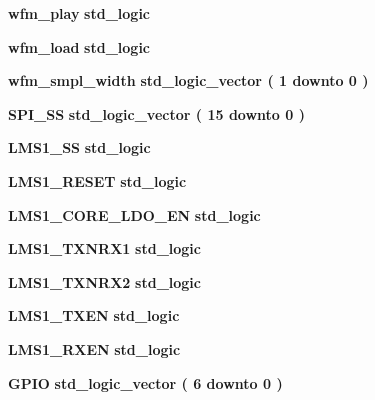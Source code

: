 \begin{DoxyCompactItemize}
\item 
{\bf wfm\+\_\+play} {\bfseries {\bfseries \textcolor{comment}{std\+\_\+logic}\textcolor{vhdlchar}{ }}} 
\item 
{\bf wfm\+\_\+load} {\bfseries {\bfseries \textcolor{comment}{std\+\_\+logic}\textcolor{vhdlchar}{ }}} 
\item 
{\bf wfm\+\_\+smpl\+\_\+width} {\bfseries {\bfseries \textcolor{comment}{std\+\_\+logic\+\_\+vector}\textcolor{vhdlchar}{ }\textcolor{vhdlchar}{(}\textcolor{vhdlchar}{ }\textcolor{vhdlchar}{ } \textcolor{vhdldigit}{1} \textcolor{vhdlchar}{ }\textcolor{keywordflow}{downto}\textcolor{vhdlchar}{ }\textcolor{vhdlchar}{ } \textcolor{vhdldigit}{0} \textcolor{vhdlchar}{ }\textcolor{vhdlchar}{)}\textcolor{vhdlchar}{ }}} 
\item 
{\bf S\+P\+I\+\_\+\+SS} {\bfseries {\bfseries \textcolor{comment}{std\+\_\+logic\+\_\+vector}\textcolor{vhdlchar}{ }\textcolor{vhdlchar}{(}\textcolor{vhdlchar}{ }\textcolor{vhdlchar}{ } \textcolor{vhdldigit}{15} \textcolor{vhdlchar}{ }\textcolor{keywordflow}{downto}\textcolor{vhdlchar}{ }\textcolor{vhdlchar}{ } \textcolor{vhdldigit}{0} \textcolor{vhdlchar}{ }\textcolor{vhdlchar}{)}\textcolor{vhdlchar}{ }}} 
\item 
{\bf L\+M\+S1\+\_\+\+SS} {\bfseries {\bfseries \textcolor{comment}{std\+\_\+logic}\textcolor{vhdlchar}{ }}} 
\item 
{\bf L\+M\+S1\+\_\+\+R\+E\+S\+ET} {\bfseries {\bfseries \textcolor{comment}{std\+\_\+logic}\textcolor{vhdlchar}{ }}} 
\item 
{\bf L\+M\+S1\+\_\+\+C\+O\+R\+E\+\_\+\+L\+D\+O\+\_\+\+EN} {\bfseries {\bfseries \textcolor{comment}{std\+\_\+logic}\textcolor{vhdlchar}{ }}} 
\item 
{\bf L\+M\+S1\+\_\+\+T\+X\+N\+R\+X1} {\bfseries {\bfseries \textcolor{comment}{std\+\_\+logic}\textcolor{vhdlchar}{ }}} 
\item 
{\bf L\+M\+S1\+\_\+\+T\+X\+N\+R\+X2} {\bfseries {\bfseries \textcolor{comment}{std\+\_\+logic}\textcolor{vhdlchar}{ }}} 
\item 
{\bf L\+M\+S1\+\_\+\+T\+X\+EN} {\bfseries {\bfseries \textcolor{comment}{std\+\_\+logic}\textcolor{vhdlchar}{ }}} 
\item 
{\bf L\+M\+S1\+\_\+\+R\+X\+EN} {\bfseries {\bfseries \textcolor{comment}{std\+\_\+logic}\textcolor{vhdlchar}{ }}} 
\item 
{\bf G\+P\+IO} {\bfseries {\bfseries \textcolor{comment}{std\+\_\+logic\+\_\+vector}\textcolor{vhdlchar}{ }\textcolor{vhdlchar}{(}\textcolor{vhdlchar}{ }\textcolor{vhdlchar}{ } \textcolor{vhdldigit}{6} \textcolor{vhdlchar}{ }\textcolor{keywordflow}{downto}\textcolor{vhdlchar}{ }\textcolor{vhdlchar}{ } \textcolor{vhdldigit}{0} \textcolor{vhdlchar}{ }\textcolor{vhdlchar}{)}\textcolor{vhdlchar}{ }}} 

\end{DoxyCompactItemize}
